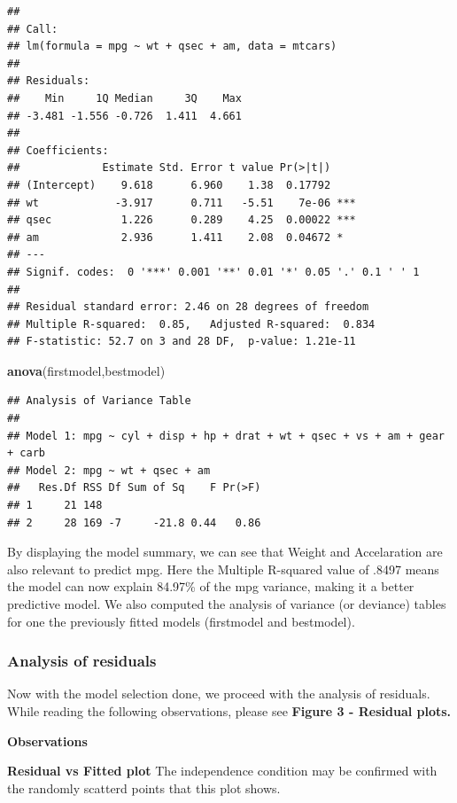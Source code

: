 \documentclass[]{article}
\newenvironment{Shaded}{\begin{snugshade}}{\end{snugshade}}
\newcommand{\KeywordTok}[1]{\textcolor[rgb]{0.13,0.29,0.53}{\textbf{{#1}}}}
\newcommand{\NormalTok}[1]{{#1}}
\begin{document}
\begin{verbatim}
## 
## Call:
## lm(formula = mpg ~ wt + qsec + am, data = mtcars)
## 
## Residuals:
##    Min     1Q Median     3Q    Max 
## -3.481 -1.556 -0.726  1.411  4.661 
## 
## Coefficients:
##             Estimate Std. Error t value Pr(>|t|)    
## (Intercept)    9.618      6.960    1.38  0.17792    
## wt            -3.917      0.711   -5.51    7e-06 ***
## qsec           1.226      0.289    4.25  0.00022 ***
## am             2.936      1.411    2.08  0.04672 *  
## ---
## Signif. codes:  0 '***' 0.001 '**' 0.01 '*' 0.05 '.' 0.1 ' ' 1
## 
## Residual standard error: 2.46 on 28 degrees of freedom
## Multiple R-squared:  0.85,   Adjusted R-squared:  0.834 
## F-statistic: 52.7 on 3 and 28 DF,  p-value: 1.21e-11
\end{verbatim}

\begin{Shaded}
\begin{Highlighting}[]
\KeywordTok{anova}\NormalTok{(firstmodel,bestmodel)}
\end{Highlighting}
\end{Shaded}

\begin{verbatim}
## Analysis of Variance Table
## 
## Model 1: mpg ~ cyl + disp + hp + drat + wt + qsec + vs + am + gear + carb
## Model 2: mpg ~ wt + qsec + am
##   Res.Df RSS Df Sum of Sq    F Pr(>F)
## 1     21 148                         
## 2     28 169 -7     -21.8 0.44   0.86
\end{verbatim}

By displaying the model summary, we can see that Weight and Accelaration
are also relevant to predict mpg. Here the Multiple R-squared value of
.8497 means the model can now explain 84.97\% of the mpg variance,
making it a better predictive model. We also computed the analysis of
variance (or deviance) tables for one the previously fitted models
(firstmodel and bestmodel).

\subsubsection{Analysis of residuals}\label{analysis-of-residuals}

Now with the model selection done, we proceed with the analysis of
residuals. While reading the following observations, please see
\textbf{Figure 3 - Residual plots.}

\textbf{Observations}

\textbf{Residual vs Fitted plot} The independence condition may be
confirmed with the randomly scatterd points that this plot shows.
\end{document}
